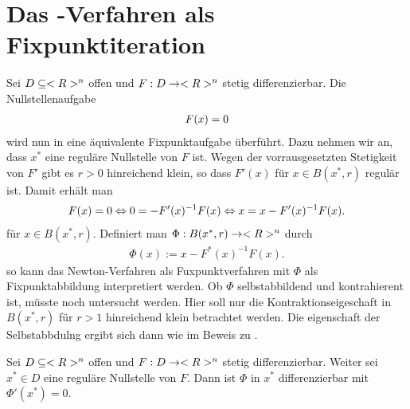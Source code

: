 \section{Das -Verfahren als Fixpunktiteration}

Sei $D \subseteq <R>^n$ offen und $F: D \to <R>^n$ stetig differenzierbar. Die Nullstellenaufgabe
\begin{align}
	F(x) = 0\notag
\end{align}
wird nun in eine äquivalente Fixpunktaufgabe überführt. Dazu nehmen wir an, dass $x^{\ast}$ eine reguläre Nullstelle von $F$ ist. Wegen der vorrausgesetzten Stetigkeit von $F'$ gibt es $r>0$ hinreichend klein, so dass $F'(x)$ für $x \in B(x^{\ast},r)$ regulär ist. Damit erhält man
\begin{align}
	F(x) = 0 \Leftrightarrow 0 = -F'(x)^{-1}F(x) \Leftrightarrow x = x - F'(x)^{-1}F(x).\notag
\end{align}
für $x \in B(x^{\ast},r)$. Definiert man $\Phi: B(x^{\ast},r) \to <R>^n$ durch
\begin{align}
	\Phi(x):= x - F^{\ast}(x)^{-1}F(x). \label{eq_1_3_8}
\end{align}
so kann das Newton-Verfahren als Fuxpunktverfahren mit $\Phi$ als Fixpunktabbildung interpretiert werden. Ob $\Phi$ selbstabbildend und kontrahierent ist, müsste noch untersucht werden. Hier soll nur die Kontraktionseigeschaft in $B(x^{\ast},r)$ für $r>1$ hinreichend klein betrachtet werden. Die eigenschaft der Selbstabbdulng ergibt sich dann wie im Beweis zu .

\begin{lemma}
	Sei $D\subseteq <R>^n$ offen und $F: D \to <R>^n$ stetig differenzierbar. Weiter sei $x^{\ast}\in D$ eine reguläre Nullstelle von $F$. Dann ist $\Phi$ in $x^{\ast}$ differenzierbar mit $\Phi'(x^{\ast}) = 0$.
\end{lemma}

